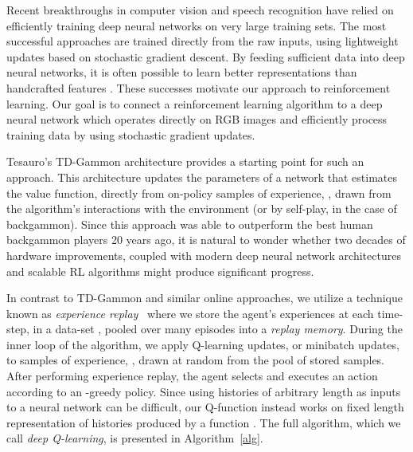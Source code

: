 \documentclass{article} \usepackage{nips13submit_e,times}
\begin{document}
Recent breakthroughs in computer vision and speech recognition have relied on efficiently training deep neural networks on very large training sets.
The most successful approaches are trained directly from the raw inputs, using lightweight updates based on stochastic gradient descent. By feeding sufficient data into deep neural networks, it is often possible to learn better representations than handcrafted features \cite{krizhevsky-imagenet}. These successes motivate our approach to reinforcement learning. Our goal is to connect a reinforcement learning algorithm to a deep neural network which operates directly on RGB images and efficiently process training data by using stochastic gradient updates. 

Tesauro's TD-Gammon architecture provides a starting point for such an approach. This architecture updates the parameters of a network that estimates the value function, directly from on-policy samples of experience, , drawn from the algorithm's interactions with the environment (or by self-play, in the case of backgammon). Since this approach was able to outperform the best human backgammon players 20 years ago, it is natural to wonder whether two decades of hardware improvements, coupled with modern deep neural network architectures and scalable RL algorithms might produce significant progress. 

In contrast to TD-Gammon and similar online approaches, we utilize a technique known as \emph{experience replay}~\cite{lin1993reinforcement} where we store the agent's experiences at each time-step,  in a data-set , pooled over many episodes into a \emph{replay memory}. During the inner loop of the algorithm, we apply Q-learning updates, or minibatch updates, to samples of experience, , drawn at random from the pool of stored samples. After performing experience replay, the agent selects and executes an action according to an -greedy policy. Since using histories of arbitrary length as inputs to a neural network can be difficult, our Q-function instead works on fixed length representation of histories produced by a function . The full algorithm, which we call \emph{deep Q-learning}, is presented in Algorithm~\ref{alg}.
\end{document}
